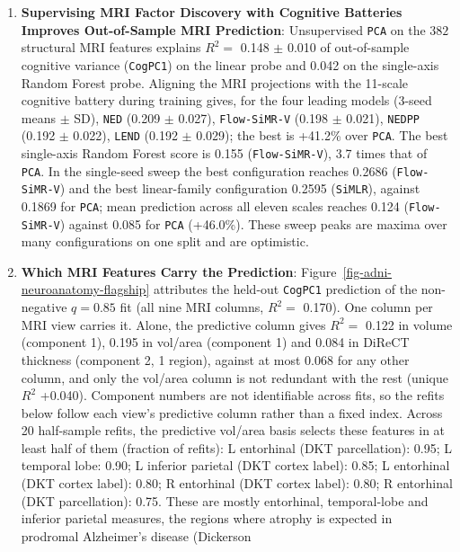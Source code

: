 \documentclass[
  10pt,
  letterpaper,
]{report}
\providecommand{\tightlist}{%
  \setlength{\itemsep}{0pt}\setlength{\parskip}{0pt}}
\begin{document}
\begin{enumerate}
\def\labelenumi{\arabic{enumi}.}
\tightlist
\item
  \textbf{Supervising MRI Factor Discovery with Cognitive Batteries
  Improves Out-of-Sample MRI Prediction}: Unsupervised \texttt{PCA} on
  the \(382\) structural MRI features explains \(R^2 =\) 0.148 \(\pm\)
  0.010 of out-of-sample cognitive variance (\texttt{CogPC1}) on the
  linear probe and 0.042 on the single-axis Random Forest probe.
  Aligning the MRI projections with the 11-scale cognitive battery
  during training gives, for the four leading models (3-seed means
  \(\pm\) SD), \texttt{NED} (0.209 \(\pm\) 0.027), \texttt{Flow-SiMR-V}
  (0.198 \(\pm\) 0.021), \texttt{NEDPP} (0.192 \(\pm\) 0.022),
  \texttt{LEND} (0.192 \(\pm\) 0.029); the best is +41.2\% over
  \texttt{PCA}. The best single-axis Random Forest score is 0.155
  (\texttt{Flow-SiMR-V}), 3.7 times that of \texttt{PCA}. In the
  single-seed sweep the best configuration reaches 0.2686
  (\texttt{Flow-SiMR-V}) and the best linear-family configuration 0.2595
  (\texttt{SiMLR}), against 0.1869 for \texttt{PCA}; mean prediction
  across all eleven scales reaches 0.124 (\texttt{Flow-SiMR-V}) against
  0.085 for \texttt{PCA} (+46.0\%). These sweep peaks are maxima over
  many configurations on one split and are optimistic.
\item
  \textbf{Which MRI Features Carry the Prediction}:
  Figure~\ref{fig-adni-neuroanatomy-flagship} attributes the held-out
  \texttt{CogPC1} prediction of the non-negative \(q = 0.85\) fit (all
  nine MRI columns, \(R^2 =\) 0.170). One column per MRI view carries
  it. Alone, the predictive column gives \(R^2 =\) 0.122 in volume
  (component 1), 0.195 in vol/area (component 1) and 0.084 in DiReCT
  thickness (component 2, 1 region), against at most 0.068 for any other
  column, and only the vol/area column is not redundant with the rest
  (unique \(R^2\) +0.040). Component numbers are not identifiable across
  fits, so the refits below follow each view's predictive column rather
  than a fixed index. Across 20 half-sample refits, the predictive
  vol/area basis selects these features in at least half of them
  (fraction of refits): L entorhinal (DKT parcellation): 0.95; L
  temporal lobe: 0.90; L inferior parietal (DKT cortex label): 0.85; L
  entorhinal (DKT cortex label): 0.80; R entorhinal (DKT cortex label):
  0.80; R entorhinal (DKT parcellation): 0.75. These are mostly
  entorhinal, temporal-lobe and inferior parietal measures, the regions
  where atrophy is expected in prodromal Alzheimer's disease ({Dickerson
}
\end{enumerate}
\end{document}
